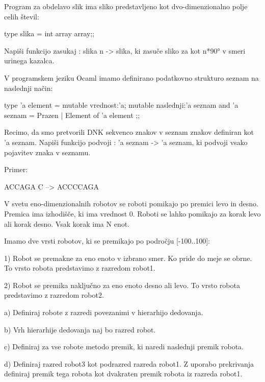 \begin{ex}
  Program za obdelavo slik ima sliko predstavljeno kot
  dvo-dimenzionalno polje celih \v stevil:

  type slika = int array array;;

  Napi\v si funkcijo zasukaj : slika n -> slika, ki zasu\v ce sliko za
  kot n*90° v smeri urinega kazalca.


\end{ex} 
\begin{ex}
  V programskem jeziku Ocaml imamo definirano podatkovno strukturo
  seznam na naslednji na\v cin:

  type 'a element = { 
     mutable vrednost:'a; 
     mutable naslednji:'a seznam 
  }
  and 'a seznam = Prazen | Element of 'a element ;;

  Recimo, da smo pretvorili DNK sekvenco znakov v seznam znakov
  definiran kot 'a seznam. Napi\v si funkcijo podvoji : 'a seznam ->
  'a seznam, ki podvoji vsako pojavitev znaka v seznamu.

  Primer:

  ACCAGA C --> ACCCCAGA


\end{ex} 
\begin{ex}
  V svetu eno-dimenzionalnih robotov se roboti pomikajo po premici
  levo in desno. Premica ima izhodi\v s\v ce, ki ima vrednost
  0. Roboti se lahko pomikajo za korak levo ali korak desno. Vsak
  korak ima N enot.

  Imamo dve vrsti robotov, ki se premikajo po podro\v cju [-100..100]:

  1) Robot se premakne za eno enoto v izbrano smer. Ko pride do meje
  se obrne. To vrsto robota predstavimo z razredom robot1.  

  2) Robot se premika naklju\v cno za eno enoto desno ali levo. To
  vrsto robota predstavimo z razredom robot2.

  a) Definiraj robote z razredi povezanimi v hierarhijo dedovanja.

  b) Vrh hierarhije dedovanja naj bo razred robot.

  c) Definiraj za vse robote metodo premik, ki naredi naslednji premik
  robota.

  d) Definiraj razred robot3 kot podrazred razreda robot1. Z uporabo
  prekrivanja definiraj premik tega robota kot dvakraten premik robota
  iz razreda robot1.



\end{ex} 
